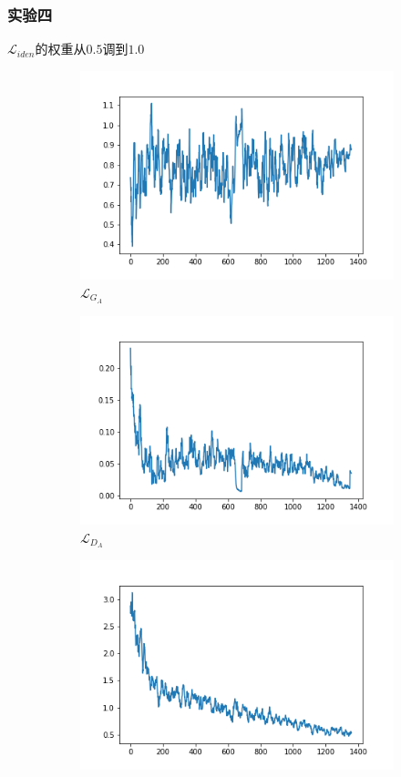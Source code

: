 \documentclass{beamer}
\begin{document}
\begin{frame}
\frametitle{实验四}
$\mathcal{L}_{iden}$的权重从$0.5$调到$1.0$
\begin{figure}[htb]
    \centering
    \begin{subfigure}[b]{0.23\linewidth}
        \includegraphics[width=\linewidth]{exp4_G_A.png}
        \caption{$\mathcal{L}_{G_A}$}
      \end{subfigure}
      \begin{subfigure}[b]{0.23\linewidth}
        \includegraphics[width=\linewidth]{exp4_D_A.png}
        \caption{$\mathcal{L}_{D_A}$}
      \end{subfigure}
      \begin{subfigure}[b]{0.23\linewidth}
        \includegraphics[width=\linewidth]{exp4_cycle_A.png}

\end{subfigure}
\end{figure}
\end{frame}
\end{document}
